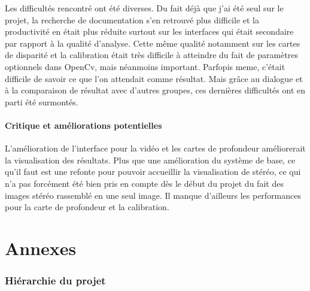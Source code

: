 \documentclass{article}
\begin{document}
Les difficultés rencontré ont été diverses. Du fait déjà que j'ai été seul sur le projet, la recherche de documentation s'en retrouvé plus difficile et la productivité en était plus réduite surtout sur les interfaces qui était secondaire par rapport à la qualité d'analyse. Cette même qualité notamment sur les cartes de disparité et la calibration était très difficile à atteindre du fait de paramètres optionnels dans OpenCv, mais néanmoins important. Parfopis meme, c'était difficile de savoir ce que l'on attendait comme résultat. Mais grâce au dialogue et à la comparaison de résultat avec d'autres groupes, ces dernières difficultés ont en parti été surmontés.

\subsection{Critique et améliorations potentielles}

L'amélioration de l'interface pour la vidéo et les cartes de profondeur améliorerait la visualisation des résultats. Plus que une amélioration du système de base, ce qu'il faut est une refonte pour pouvoir accueillir la visualisation de stéréo, ce qui n'a pas forcément été bien pris en compte dès le début du projet du fait des images stéréo rassemblé en une seul image.
Il manque d'ailleurs les performances pour la carte de profondeur et la calibration.

\newpage
\appendix
\part{Annexes}

\listoffigures

\newpage
\section{Hiérarchie du projet}

\end{document}
